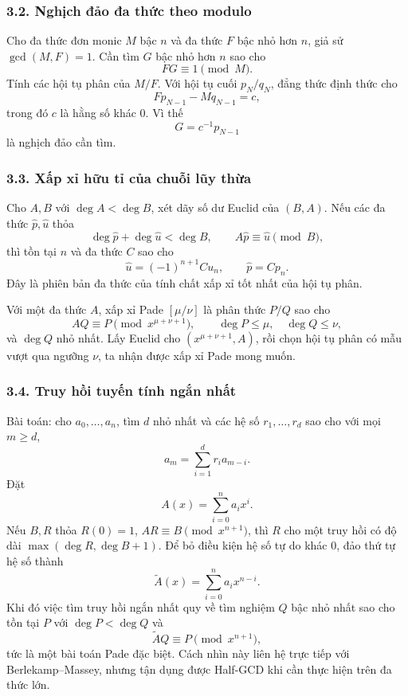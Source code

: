 \documentclass[11pt]{article}
\begin{document}
\subsubsection*{3.2. Nghịch đảo đa thức theo modulo}

Cho đa thức đơn monic \(M\) bậc \(n\) và đa thức \(F\) bậc nhỏ hơn \(n\), giả
sử \(\gcd(M,F)=1\). Cần tìm \(G\) bậc nhỏ hơn \(n\) sao cho
\[
  FG\equiv1\pmod M.
\]
Tính các hội tụ phân của \(M/F\). Với hội tụ cuối \(p_N/q_N\), đẳng thức định
thức cho
\[
  Fp_{N-1}-Mq_{N-1}=c,
\]
trong đó \(c\) là hằng số khác \(0\). Vì thế
\[
  G=c^{-1}p_{N-1}
\]
là nghịch đảo cần tìm.

\subsubsection*{3.3. Xấp xỉ hữu tỉ của chuỗi lũy thừa}

Cho \(A,B\) với \(\deg A<\deg B\), xét dãy số dư Euclid của \((B,A)\). Nếu
các đa thức \(\hat p,\hat u\) thỏa
\[
  \deg\hat p+\deg\hat u<\deg B,\qquad A\hat p\equiv \hat u\pmod B,
\]
thì tồn tại \(n\) và đa thức \(C\) sao cho
\[
  \hat u=(-1)^{n+1}C u_n,\qquad \hat p=Cp_n.
\]
Đây là phiên bản đa thức của tính chất xấp xỉ tốt nhất của hội tụ phân.

Với một đa thức \(A\), xấp xỉ Pade \([\mu/\nu]\) là phân thức \(P/Q\) sao cho
\[
  AQ\equiv P\pmod{x^{\mu+\nu+1}},\qquad
  \deg P\le \mu,\quad \deg Q\le\nu,
\]
và \(\deg Q\) nhỏ nhất. Lấy Euclid cho \((x^{\mu+\nu+1},A)\), rồi chọn hội tụ
phân có mẫu vượt qua ngưỡng \(\nu\), ta nhận được xấp xỉ Pade mong muốn.

\subsubsection*{3.4. Truy hồi tuyến tính ngắn nhất}

Bài toán: cho \(a_0,\ldots,a_n\), tìm \(d\) nhỏ nhất và các hệ số
\(r_1,\ldots,r_d\) sao cho với mọi \(m\ge d\),
\[
  a_m=\sum_{i=1}^{d} r_i a_{m-i}.
\]
Đặt
\[
  A(x)=\sum_{i=0}^{n} a_i x^i.
\]
Nếu \(B,R\) thỏa \(R(0)=1\), \(AR\equiv B\pmod{x^{n+1}}\), thì \(R\) cho một
truy hồi có độ dài \(\max(\deg R,\deg B+1)\). Để bỏ điều kiện hệ số tự do
khác \(0\), đảo thứ tự hệ số thành
\[
  \widetilde A(x)=\sum_{i=0}^{n}a_i x^{n-i}.
\]
Khi đó việc tìm truy hồi ngắn nhất quy về tìm nghiệm \(Q\) bậc nhỏ nhất sao
cho tồn tại \(P\) với \(\deg P<\deg Q\) và
\[
  \widetilde A Q\equiv P\pmod{x^{n+1}},
\]
tức là một bài toán Pade đặc biệt. Cách nhìn này liên hệ trực tiếp với
Berlekamp--Massey, nhưng tận dụng được Half-GCD khi cần thực hiện trên đa
thức lớn.
\end{document}
